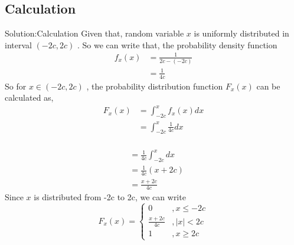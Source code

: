 \documentclass{beamer}
\providecommand{\brak}[1]{\ensuremath{\left(#1\right)}}
\providecommand{\abs}[1]{\left\vert#1\right\vert}
\begin{document}
\subsection{Calculation}
\begin{frame}{Solution:Calculation} Given that, random variable $x$ is uniformly distributed in interval $\brak{-2c,2c}$ . So we can write that, the probability density function 
               \begin{align}
                        f_{x}\brak{x} &= \frac{1}{2c - \brak{-2c}}\\
                                            &= \frac{1}{4c}
               \end{align}
       So for $ x \in \brak{-2c,2c} $ , the probability distribution function $F_{x}\brak{x}$ can be calculated as,
               \begin{align}
                           F_{x}\brak{x} &= \int_{-2c}^{x} f_x\brak{x}dx\\
                                                &= \int_{-2c}^{x} \frac{1}{4c}dx\\
               \end{align}
\end{frame}
\begin{frame}
                \begin{align}             &= \frac{1}{4c}\int_{-2c}^{x}dx\\
                                                &= \frac{1}{4c}\brak{x + 2c}\\
                                                &= \frac{x+2c}{4c}
                \end{align}
            Since $x$ is distributed from -2c to 2c, we can write
                 \begin{equation*}
                                 F_{x}\brak{x} = \begin{cases}
                                                          0  &, x \leq -2c \\
                                                         \frac{x+2c}{4c} &, \abs{x} < 2c \\
                                                         1  & , x \geq 2c
                                                        \end{cases}
                 \end{equation*}
\end{frame}
\end{document}

